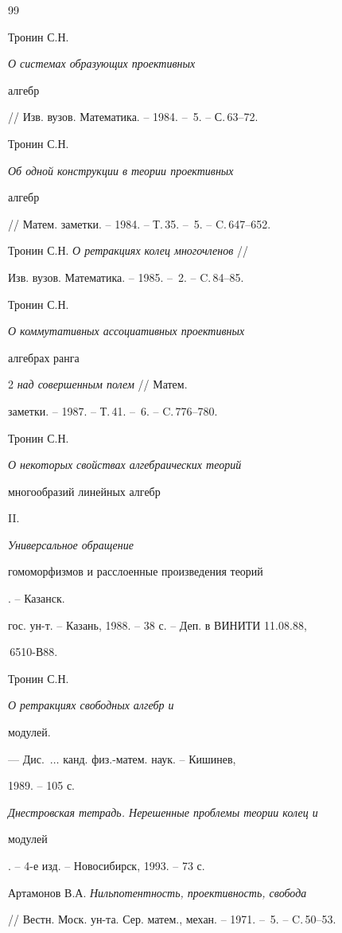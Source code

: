 \begin{thebibliography}{99}







Тронин С.Н. {\em О системах образующих проективных


алгебр} // Изв. вузов. Математика. -- 1984. -- \No\,5. -- С.\,63--72.




Тронин С.Н. {\em Об одной конструкции в теории проективных


алгебр} // Матем. заметки. -- 1984. -- Т.\,35. -- \No\,5. -- C.\,647--652.




Тронин С.Н. {\em О ретракциях колец многочленов} //


Изв. вузов. Математика. -- 1985. -- \No\,2. -- C.\,84--85.




Тронин С.Н. {\em О коммутативных ассоциативных проективных


алгебрах ранга} 2 {\em над совершенным полем} // Матем.


заметки. -- 1987. -- Т.\,41. -- \No\,6. -- C.\,776--780.




Тронин С.Н. {\em О некоторых свойствах алгебраических теорий


многообразий линейных алгебр} II. {\em Универсальное обращение


гомоморфизмов и расслоенные произведения теорий}. -- Казанск.


гос. ун-т. -- Казань, 1988. -- 38 с. -- Деп. в ВИНИТИ 11.08.88,


\No\,6510-В88.




Тронин С.Н. {\em О ретракциях свободных алгебр и


модулей.} --- Дис.~$\dotsc$ канд. физ.-матем. наук. -- Кишинев,


1989. -- 105 с.




{\em Днестровская тетрадь. Нерешенные проблемы теории колец и


модулей}. -- 4-е изд. -- Новосибирск, 1993. -- 73 с.




Артамонов В.А. {\em Нильпотентность, проективность, свобода}


// Вестн. Моск. ун-та. Сер. матем., механ. -- 1971. -- \No\,5. -- C.\,50--53.



\end{thebibliography}
